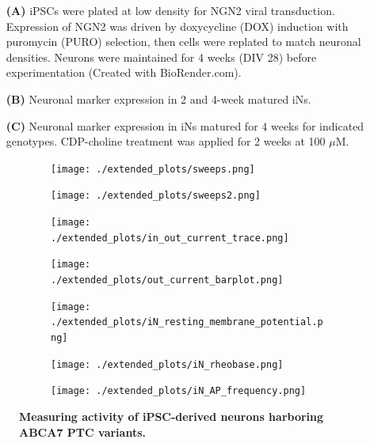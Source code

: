 \documentclass[12pt]{article}
\begin{document}
\begin{itemize}
    \item[\textbf{(A)}] iPSCs were plated at low density for NGN2 viral transduction. Expression of NGN2 was driven by doxycycline (DOX) induction with puromycin (PURO) selection, then cells were replated to match neuronal densities. Neurons were maintained for 4 weeks (DIV 28) before experimentation (Created with BioRender.com). 
    \item[\textbf{(B)}] Neuronal marker expression in 2 and 4-week matured iNs. 
    \item[\textbf{(C)}] Neuronal marker expression in iNs matured for 4 weeks for indicated genotypes. CDP-choline treatment was applied for 2 weeks at 100 $\mu$M.
\end{itemize} \clearpage
\begin{figure}[H]
    \begin{subfigure}[t]{0.33\textwidth}
        \caption{}
        \texttt{[image: ./extended\_plots/sweeps.png]}        
    \end{subfigure}   
    \begin{subfigure}[t]{0.2\textwidth}
        \caption{}
        \texttt{[image: ./extended\_plots/sweeps2.png]}        
    \end{subfigure}   
    \begin{subfigure}[t]{0.33\textwidth}
        \caption{}
        \texttt{[image: ./extended\_plots/in\_out\_current\_trace.png]}        
    \end{subfigure}  
    \begin{subfigure}[t]{0.33\textwidth}
        \caption{}
        \texttt{[image: ./extended\_plots/out\_current\_barplot.png]}        
    \end{subfigure}  
    \begin{subfigure}[t]{0.25\textwidth}
        \caption{}
        \texttt{[image: ./extended\_plots/iN\_resting\_membrane\_potential.png]}        
    \end{subfigure}  
    \begin{subfigure}[t]{0.25\textwidth}
        \caption{}
        \texttt{[image: ./extended\_plots/iN\_rheobase.png]}        
    \end{subfigure} 
    \hspace{1cm}
    \begin{subfigure}[t]{0.4\textwidth}
        \caption{}
        \texttt{[image: ./extended\_plots/iN\_AP\_frequency.png]}        
    \end{subfigure}  
    \caption{
        \textbf{Measuring activity of iPSC-derived neurons harboring ABCA7 PTC variants.}\\
    }
    \label{fig:differentiating_iPSC_neurons}
\end{figure}
\end{document}
